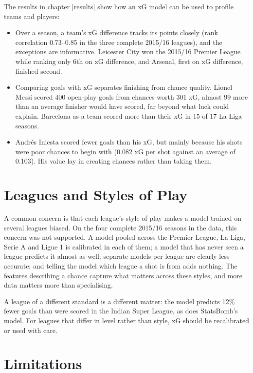 The results in chapter \ref{results} show how an xG model can be used to profile teams and players:
\begin{itemize}
    \item Over a season, a team's xG difference tracks its points closely (rank correlation 0.73--0.85 in the three complete 2015/16 leagues), and the exceptions are informative. Leicester City won the 2015/16 Premier League while ranking only 6th on xG difference, and Arsenal, first on xG difference, finished second.
    \item Comparing goals with xG separates finishing from chance quality. Lionel Messi scored 400 open-play goals from chances worth 301 xG, almost 99 more than an average finisher would have scored, far beyond what luck could explain. Barcelona as a team scored more than their xG in 15 of 17 La Liga seasons.
    \item Andrés Iniesta scored fewer goals than his xG, but mainly because his shots were poor chances to begin with (0.082 xG per shot against an average of 0.103). His value lay in creating chances rather than taking them.
\end{itemize}

\section{Leagues and Styles of Play}

A common concern is that each league's style of play makes a model trained on several leagues biased. On the four complete 2015/16 seasons in the data, this concern was not supported. A model pooled across the Premier League, La Liga, Serie A and Ligue 1 is calibrated in each of them; a model that has never seen a league predicts it almost as well; separate models per league are clearly less accurate; and telling the model which league a shot is from adds nothing. The features describing a chance capture what matters across these styles, and more data matters more than specialising.

A league of a different standard is a different matter: the model predicts 12\% fewer goals than were scored in the Indian Super League, as does StatsBomb's model. For leagues that differ in level rather than style, xG should be recalibrated or used with care.

\section{Limitations}

